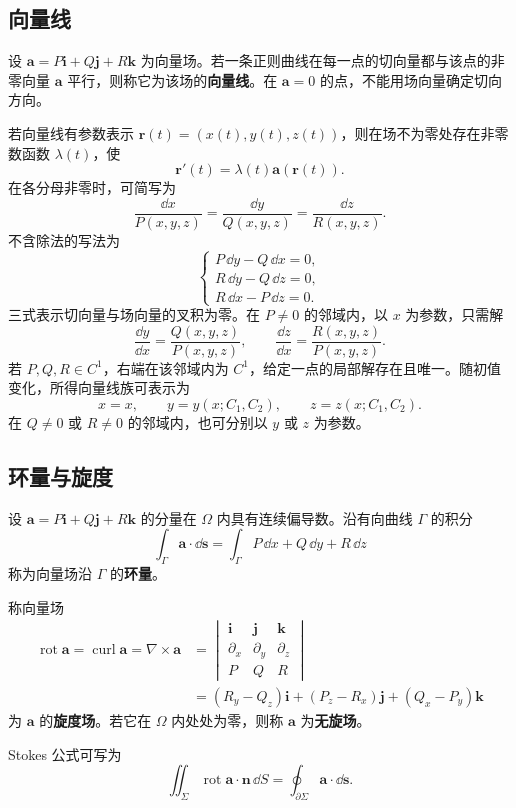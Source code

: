 \subsection*{向量线}
\begin{definition}
设 $\boldsymbol a=P\boldsymbol i+Q\boldsymbol j+R\boldsymbol k$ 为向量场。若一条正则曲线在每一点的切向量都与该点的非零向量 $\boldsymbol a$ 平行，则称它为该场的\textbf{向量线}。在 $\boldsymbol a=0$ 的点，不能用场向量确定切向方向。
\end{definition}
若向量线有参数表示 $\boldsymbol r(t)=(x(t),y(t),z(t))$，则在场不为零处存在非零数函数 $\lambda(t)$，使
\[
\boldsymbol r'(t)=\lambda(t)\boldsymbol a(\boldsymbol r(t)).
\]
在各分母非零时，可简写为
\[
\frac{\dd x}{P(x,y,z)}=\frac{\dd y}{Q(x,y,z)}=\frac{\dd z}{R(x,y,z)}.
\]
不含除法的写法为
\[
\begin{cases}
P\,\dd y-Q\,\dd x=0,\\
R\,\dd y-Q\,\dd z=0,\\
R\,\dd x-P\,\dd z=0.
\end{cases}
\]
三式表示切向量与场向量的叉积为零。在 $P\ne0$ 的邻域内，以 $x$ 为参数，只需解
\[
\frac{\dd y}{\dd x}=\frac{Q(x,y,z)}{P(x,y,z)},\qquad
\frac{\dd z}{\dd x}=\frac{R(x,y,z)}{P(x,y,z)}.
\]
若 $P,Q,R\in C^1$，右端在该邻域内为 $C^1$，给定一点的局部解存在且唯一。随初值变化，所得向量线族可表示为
\[
x=x,\qquad y=y(x;C_1,C_2),\qquad z=z(x;C_1,C_2).
\]
在 $Q\ne0$ 或 $R\ne0$ 的邻域内，也可分别以 $y$ 或 $z$ 为参数。

\subsection*{环量与旋度}
\begin{definition}
设 $\boldsymbol a=P\boldsymbol i+Q\boldsymbol j+R\boldsymbol k$ 的分量在 $\Omega$ 内具有连续偏导数。沿有向曲线 $\Gamma$ 的积分
\[
\int_\Gamma\boldsymbol a\cdot\dd\boldsymbol s
=\int_\Gamma P\,\dd x+Q\,\dd y+R\,\dd z
\]
称为向量场沿 $\Gamma$ 的\textbf{环量}。

称向量场
\[
\begin{aligned}
\operatorname{rot}\boldsymbol a
=\operatorname{curl}\boldsymbol a
=\nabla\times\boldsymbol a
&=\begin{vmatrix}
\boldsymbol i&\boldsymbol j&\boldsymbol k\\
\partial_x&\partial_y&\partial_z\\
P&Q&R
\end{vmatrix}\\
&=(R_y-Q_z)\boldsymbol i+(P_z-R_x)\boldsymbol j+(Q_x-P_y)\boldsymbol k
\end{aligned}
\]
为 $\boldsymbol a$ 的\textbf{旋度场}。若它在 $\Omega$ 内处处为零，则称 $\boldsymbol a$ 为\textbf{无旋场}。
\end{definition}
Stokes 公式可写为
\[
\displaystyle\iint_\Sigma\operatorname{rot}\boldsymbol a\cdot\boldsymbol n\,\dd S
=\oint_{\partial\Sigma}\boldsymbol a\cdot\dd\boldsymbol s.
\]

